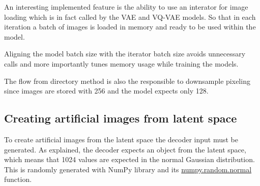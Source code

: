 An interesting implemented feature is the ability to use an interator for image loading which is in fact called by the VAE and VQ-VAE models. So that in each iteration a batch of images is loaded in memory and ready to be used within the model.

Aligning the model batch size with the iterator batch size avoids unnecessary calls and more importantly tunes memory usage while training the models.

The flow from directory method is also the responsible to downsample pixeling since images are stored with 256 and the model expects only 128.

\subsection{Creating artificial images from latent space}

To create artificial images from the latent space the decoder input must be generated. As explained, the decoder expects an object from the latent space, which means that 1024 values are expected in the normal Gaussian distribution. This is randomly generated with NumPy library and its \href{https://numpy.org/doc/stable/reference/random/generated/numpy.random.normal.html}{numpy.random.normal} function.